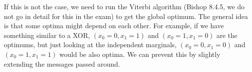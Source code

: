 \begin{itemize}
	If this is not the case, we need to run the Viterbi algorithm (Bishop 8.4.5, we do not go in detail for this in the exam) to get the global optimum. The general idea is that some optima might depend on each other. For example, if we have something similar to a XOR, $(x_0=0, x_1=1)$ and $(x_0=1,x_1=0)$ are the optimums, but just looking at the independent marginals, $(x_0=0,x_1=0)$ and $(x_0=1,x_1=1)$ would be also optima. We can prevent this by slightly extending the messages passed around.
\end{itemize}